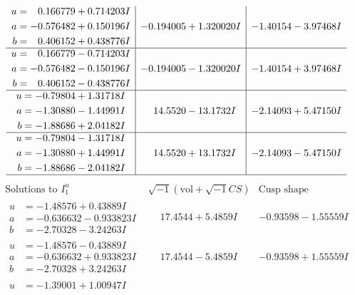 \documentclass[1p]{elsarticle_modified}
\theoremstyle{definition}
\newcommand{\I}{\sqrt{-1}}
\begin{document}
$$\begin{array}{c|c|c}
\begin{aligned}
u &= \phantom{-}0.166779 + 0.714203 I \\
a &= -0.576482 + 0.150196 I \\
b &= \phantom{-}0.406152 + 0.438776 I\end{aligned}
 & -0.194005 + 1.320020 I & -1.40154 - 3.97468 I \\ \hline\begin{aligned}
u &= \phantom{-}0.166779 - 0.714203 I \\
a &= -0.576482 - 0.150196 I \\
b &= \phantom{-}0.406152 - 0.438776 I\end{aligned}
 & -0.194005 - 1.320020 I & -1.40154 + 3.97468 I \\ \hline\begin{aligned}
u &= -0.79804 + 1.31718 I \\
a &= -1.30880 - 1.44991 I \\
b &= -1.88686 + 2.04182 I\end{aligned}
 & \phantom{-}14.5520 - 13.1732 I & -2.14093 + 5.47150 I \\ \hline\begin{aligned}
u &= -0.79804 - 1.31718 I \\
a &= -1.30880 + 1.44991 I \\
b &= -1.88686 - 2.04182 I\end{aligned}
 & \phantom{-}14.5520 + 13.1732 I & -2.14093 - 5.47150 I\\
 \hline 
 \end{array}$$\newpage$$\begin{array}{c|c|c}  
\text{Solutions to }I^u_{1}& \I (\text{vol} + \sqrt{-1}CS) & \text{Cusp shape}\\
 \hline 
\begin{aligned}
u &= -1.48576 + 0.43889 I \\
a &= -0.636632 - 0.933823 I \\
b &= -2.70328 - 3.24263 I\end{aligned}
 & \phantom{-}17.4544 + 5.4859 I & -0.93598 - 1.55559 I \\ \hline\begin{aligned}
u &= -1.48576 - 0.43889 I \\
a &= -0.636632 + 0.933823 I \\
b &= -2.70328 + 3.24263 I\end{aligned}
 & \phantom{-}17.4544 - 5.4859 I & -0.93598 + 1.55559 I \\ \hline\begin{aligned}
u &= -1.39001 + 1.00947 I \\

\end{aligned}
\end{array}$$
\end{document}
